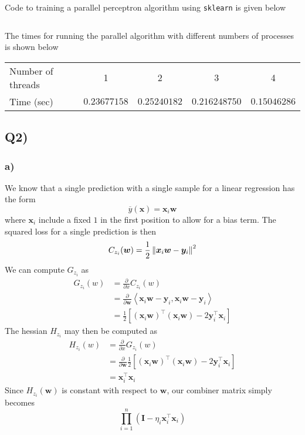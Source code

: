 Code to training a parallel perceptron algorithm using \texttt{sklearn} is given below
\inputminted[mathescape,
    linenos,
    numbersep=5pt,
    frame=lines,
    framesep=2mm]{python}{src/PERCEPTRON_demo.py}
    
The times for running the parallel algorithm with different numbers of processes is shown below
\begin{table}[h!!!]
\begin{tabular}{l|c|c|c|c}
Number of threads & 1 & 2 & 3 & 4 \\ \cline{2-5} 
Time (sec)        & $0.23677158$ & $0.25240182$ & $0.216248750$ & $0.15046286$
\end{tabular}
\end{table}

\subsection*{{\bf Q2)}}
\subsubsection*{{\bf a)}}
We know that a single prediction with a single sample for a linear regression has the form
\[
    \overline{y} (\bm{x}) = \bm{x}_{i} \bm{w}
\]
where $\bm{x}_{i}$ include a fixed $1$ in the first position to allow for a bias term. The squared loss for a single prediction is then
\[
    C_{z_{i}} (\bm{w}) = \frac{1}{2} \left\lVert\bm{x}_{i} \bm{w} - \bm{y}_{i}\right\rVert^2
\]
We can compute $G_{z_{i}}$ as
\begin{align*}
    G_{z_{i}} (w) &= \frac{\partial}{\partial x} C_{z_{i}} (w) \\
    &= \frac{\partial}{\partial \bm{w}} \left\langle \bm{x}_{i} \bm{w} - \bm{y}_{i}, \bm{x}_{i} \bm{w} - \bm{y}_{i} \right\rangle \\
    &= \frac{1}{2} \left[ (\bm{x}_{i} \bm{w})^{\top} (\bm{x}_{i} \bm{w}) - 2 \bm{y}_{i}^{\top} \bm{x}_{i} \right]
\end{align*}
The hessian $H_{z_{i}}$ may then be computed as
\begin{align*}
    H_{z_{i}} (w) &= \frac{\partial}{\partial x} G_{z_{i}} (w) \\
    &= \frac{\partial}{\partial \bm{w}} \frac{1}{2} \left[ (\bm{x}_{i} \bm{w})^{\top} (\bm{x}_{i} \bm{w}) - 2 \bm{y}_{i}^{\top} \bm{x}_{i} \right] \\
    &= \bm{x}_{i}^{\top} \bm{x}_{i}
\end{align*}
Since $H_{z_{i}} (\bm{w})$ is constant with respect to $\bm{w}$, our combiner matrix simply becomes
\[
    \prod_{i=1}^{n} \left( \bm{I} - \eta_{i} \bm{x}_{i}^{\top} \bm{x}_{i} \right)
\]


